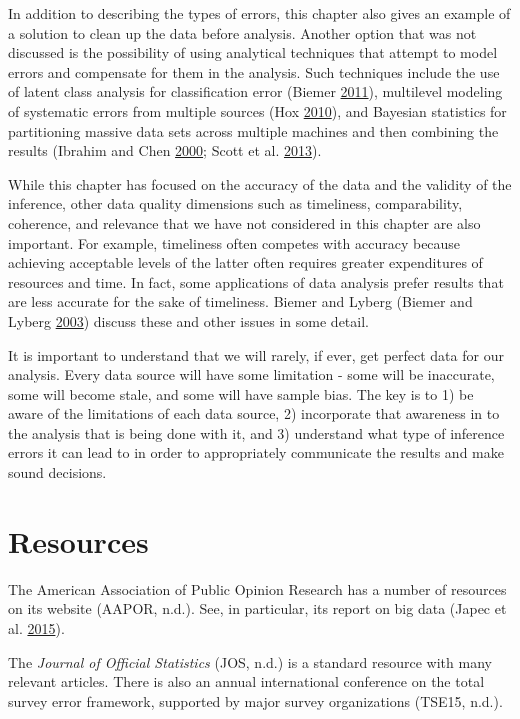 \documentclass[]{krantz}
\begin{document}
In addition to describing the types of errors, this chapter also gives
an example of a solution to clean up the data before analysis. Another
option that was not discussed is the possibility of using analytical
techniques that attempt to model errors and compensate for them in the
analysis. Such techniques include the use of latent class analysis for
classification error (Biemer
\protect\hyperlink{ref-biemer2011latent}{2011}), multilevel modeling of
systematic errors from multiple sources (Hox
\protect\hyperlink{ref-hox2010multilevel}{2010}), and Bayesian
statistics for partitioning massive data sets across multiple machines
and then combining the results (Ibrahim and Chen
\protect\hyperlink{ref-ibrahim2000power}{2000}; Scott et al.
\protect\hyperlink{ref-scott2013bayes}{2013}).

While this chapter has focused on the accuracy of the data and the
validity of the inference, other data quality dimensions such as
timeliness, comparability, coherence, and relevance that we have not
considered in this chapter are also important. For example, timeliness
often competes with accuracy because achieving acceptable levels of the
latter often requires greater expenditures of resources and time. In
fact, some applications of data analysis prefer results that are less
accurate for the sake of timeliness. Biemer and Lyberg (Biemer and
Lyberg \protect\hyperlink{ref-biemer2003}{2003}) discuss these and other
issues in some detail.

It is important to understand that we will rarely, if ever, get perfect
data for our analysis. Every data source will have some limitation -
some will be inaccurate, some will become stale, and some will have
sample bias. The key is to 1) be aware of the limitations of each data
source, 2) incorporate that awareness in to the analysis that is being
done with it, and 3) understand what type of inference errors it can
lead to in order to appropriately communicate the results and make sound
decisions.

\section{Resources}\label{resources-5}

The American Association of Public Opinion Research has a number of
resources on its website (AAPOR, n.d.). See, in particular, its report
on big data (Japec et al. \protect\hyperlink{ref-japec2015big}{2015}).

The \emph{Journal of Official Statistics} (JOS, n.d.) is a standard
resource with many relevant articles. There is also an annual
international conference on the total survey error framework, supported
by major survey organizations (TSE15, n.d.).
\end{document}
